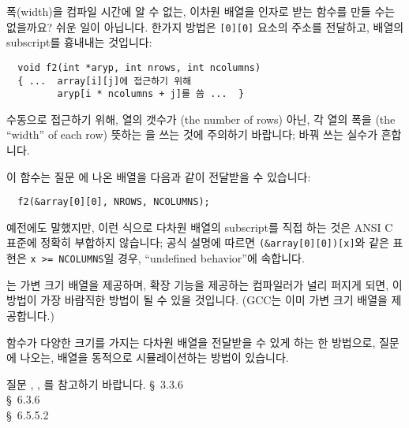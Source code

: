 \begin{faq}
	폭(width)을 컴파일 시간에 알 수 없는, 이차원 배열을 인자로 받는
	함수를 만들 수는 없을까요?
\A	
	쉬운 일이 아닙니다. 
	한가지 방법은 \verb+[0][0]+ 요소의 주소를 전달하고,
	배열의 subscript를 흉내내는 것입니다:

\begin{verbatim}
  void f2(int *aryp, int nrows, int ncolumns)
  { ...  array[i][j]에 접근하기 위해
         aryp[i * ncolumns + j]를 씀 ...  }
\end{verbatim}
	\noindent 수동으로 접근하기 위해, 열의 갯수가 (the number of rows)
	아닌, 각 열의 폭을 (the ``width'' of each row) 뜻하는 을
	쓰는 것에 주의하기 바랍니다; 바꿔 쓰는 실수가 흔합니다.

	이 함수는 질문 에 나온 배열을 다음과 같이 전달받을 수
	있습니다:
\begin{verbatim}
  f2(&array[0][0], NROWS, NCOLUMNS);
\end{verbatim}
	
	예전에도 말했지만, 이런 식으로 다차원 배열의 subscript를 직접 하는 것은
	ANSI C 표준에 정확히 부합하지 않습니다; 공식 설명에 따르면
	\verb+(&array[0][0])[x]+와 같은 표현은
        \verb+x >= NCOLUMNS+일 경우,
	``undefined behavior''에 속합니다.

	\cite{c9x}는 가변 크기 배열을 제공하며, 
	\cite{c9x} 확장 기능을 제공하는 컴파일러가
	널리 퍼지게 되면, 이 방법이 가장 바람직한 방법이 될 수 있을 것입니다.
	(GCC는 이미 가변 크기 배열을 제공합니다.)

	함수가 다양한 크기를 가지는 다차원 배열을 전달받을 수 있게 하는
	한 방법으로, 질문 에 나오는, 배열을 동적으로 시뮬레이션하는
	방법이 있습니다.

	질문 , , 를 참고하기 바랍니다.
\R
	\cite{ansi} \S\ 3.3.6 \\
	\cite{c89} \S\ 6.3.6 \\
	\cite{c9x} \S\ 6.5.5.2
\end{faq}

